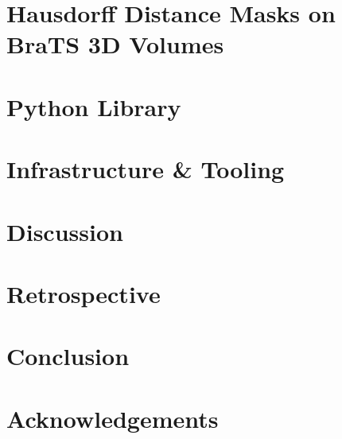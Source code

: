 \chapter{Hausdorff Distance Masks on BraTS 3D Volumes}


\chapter{Python Library}


\chapter{Infrastructure \& Tooling}


\chapter{Discussion}


\chapter{Retrospective}


\chapter{Conclusion}


\chapter{Acknowledgements}

